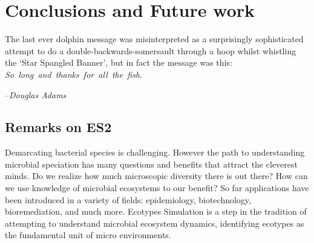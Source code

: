 \gobbletocpage
\chapter{Conclusions and Future work}
\restoretocpage

\begin{shadequote}
The last ever dolphin message was misinterpreted as a surprisingly sophisticated attempt to do a double-backwards-somersault through a hoop whilst whistling the `Star Spangled Banner', but in fact the message was this: \mbox{\emph{So long and thanks for all the fish}}. \par--\emph{Douglas Adams}
\end{shadequote}


\section{Remarks on ES2}
Demarcating bacterial species is challenging.
However the path to understanding microbial speciation has many questions and benefits that attract the cleverest minds.
Do we realize how much microscopic diversity there is out there?
How can we use knowledge of microbial ecosystems to our benefit?
So far applications have been introduced in a variety of fields: epidemiology, biotechnology, bioremediation, and much more.
Ecotypes Simulation is a step in the tradition of attempting to understand microbial ecosystem dynamics, identifying ecotypes as the fundamental unit of micro environments.


